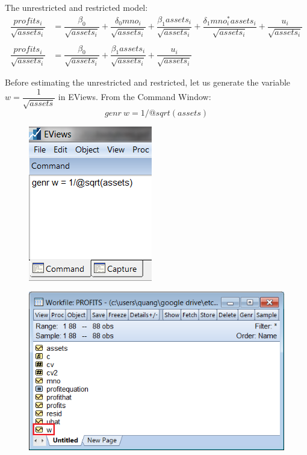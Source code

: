 \documentclass[12pt]{report}
\begin{document}
\noindent The unrestricted and restricted model: \begin{align*}
	\dfrac{profits_i}{\sqrt{assets_i}} &= \dfrac{\beta_0}{\sqrt{assets_i}} + \dfrac{\delta_0mno_i}{\sqrt{assets_i}} + \dfrac{\beta_1assets_i}{\sqrt{assets_i}} + \dfrac{\delta_1mno_i^*assets_i}{\sqrt{assets_i}} + \dfrac{u_i}{\sqrt{assets_i}} \\ \\
	\dfrac{profits_i}{\sqrt{assets_i}} &= \dfrac{\beta_0}{\sqrt{assets_i}} + \dfrac{\beta_1assets_i}{\sqrt{assets_i}} + \dfrac{u_i}{\sqrt{assets_i}}
\end{align*}

\noindent Before estimating the unrestricted and restricted, let us generate the variable $w = \dfrac{1}{\sqrt{assets}}$ in EViews. From the Command Window: $$genr\ w=1/@sqrt(assets)$$
\begin{figure}[H]
	\centering
	\includegraphics{tute9_9}
\end{figure}
\vspace{-\baselineskip}
\begin{figure}[H]
	\centering
	\includegraphics{tute9_10}
\end{figure}
\vspace{-\baselineskip}
\end{document}

